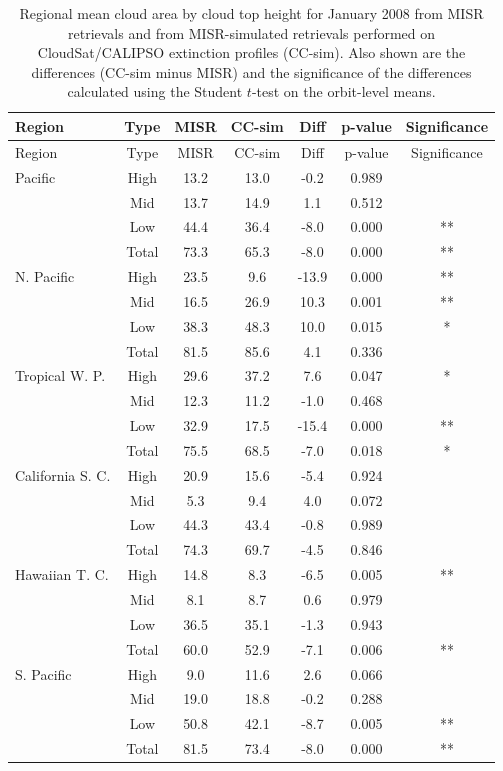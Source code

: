 \begin{longtable}[]{@{}lcccccc@{}}
\caption{\label{tbl:misr_cldmisr_table_january}Regional mean cloud area
by cloud top height for January 2008 from MISR retrievals and from
MISR-simulated retrievals performed on CloudSat/CALIPSO extinction
profiles (CC-sim). Also shown are the differences (CC-sim minus MISR)
and the significance of the differences calculated using the Student
\(t\)-test on the orbit-level means. }\tabularnewline
\toprule
Region & Type & MISR & CC-sim & Diff & p-value &
Significance\tabularnewline
\midrule
\endfirsthead
\toprule
Region & Type & MISR & CC-sim & Diff & p-value &
Significance\tabularnewline
\midrule
\endhead
Pacific & High & 13.2 & 13.0 & -0.2 & 0.989 &\tabularnewline
& Mid & 13.7 & 14.9 & 1.1 & 0.512 &\tabularnewline
& Low & 44.4 & 36.4 & -8.0 & 0.000 & **\tabularnewline
& Total & 73.3 & 65.3 & -8.0 & 0.000 & **\tabularnewline
N. Pacific & High & 23.5 & 9.6 & -13.9 & 0.000 & **\tabularnewline
& Mid & 16.5 & 26.9 & 10.3 & 0.001 & **\tabularnewline
& Low & 38.3 & 48.3 & 10.0 & 0.015 & *\tabularnewline
& Total & 81.5 & 85.6 & 4.1 & 0.336 &\tabularnewline
Tropical W. P. & High & 29.6 & 37.2 & 7.6 & 0.047 & *\tabularnewline
& Mid & 12.3 & 11.2 & -1.0 & 0.468 &\tabularnewline
& Low & 32.9 & 17.5 & -15.4 & 0.000 & **\tabularnewline
& Total & 75.5 & 68.5 & -7.0 & 0.018 & *\tabularnewline
California S. C. & High & 20.9 & 15.6 & -5.4 & 0.924 &\tabularnewline
& Mid & 5.3 & 9.4 & 4.0 & 0.072 &\tabularnewline
& Low & 44.3 & 43.4 & -0.8 & 0.989 &\tabularnewline
& Total & 74.3 & 69.7 & -4.5 & 0.846 &\tabularnewline
Hawaiian T. C. & High & 14.8 & 8.3 & -6.5 & 0.005 & **\tabularnewline
& Mid & 8.1 & 8.7 & 0.6 & 0.979 &\tabularnewline
& Low & 36.5 & 35.1 & -1.3 & 0.943 &\tabularnewline
& Total & 60.0 & 52.9 & -7.1 & 0.006 & **\tabularnewline
S. Pacific & High & 9.0 & 11.6 & 2.6 & 0.066 &\tabularnewline
& Mid & 19.0 & 18.8 & -0.2 & 0.288 &\tabularnewline
& Low & 50.8 & 42.1 & -8.7 & 0.005 & **\tabularnewline
& Total & 81.5 & 73.4 & -8.0 & 0.000 & **\tabularnewline
\bottomrule
\end{longtable}

